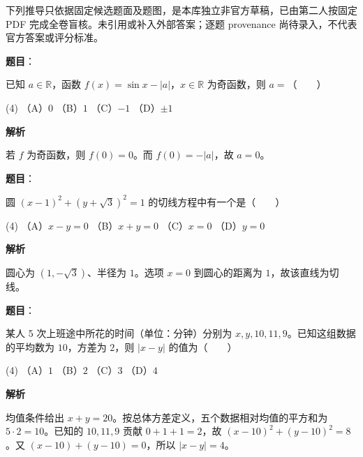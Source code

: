 

\begin{gktip}
下列推导只依据固定候选题面及题图，是本库独立非官方草稿，已由第二人按固定 PDF 完成全卷盲核。未引用或补入外部答案；逐题 provenance 尚待录入，不代表官方答案或评分标准。
\end{gktip}

\begin{answer}

\textbf{题目}：

已知 $a\in\mathbb R$，函数 $f(x)=\sin x-|a|$，$x\in\mathbb R$ 为奇函数，则 $a=$\mbox{（　　）}

\begin{gkopts}(4)
\task （A）$0$
\task （B）$1$
\task （C）$-1$
\task （D）$\pm1$
\end{gkopts}

\textbf{解析}

若 $f$ 为奇函数，则 $f(0)=0$。而 $f(0)=-|a|$，故 $a=0$。


\end{answer}
\begin{answer}

\textbf{题目}：

圆 $(x-1)^2+(y+\sqrt3)^2=1$ 的切线方程中有一个是\mbox{（　　）}

\begin{gkopts}(4)
\task （A）$x-y=0$
\task （B）$x+y=0$
\task （C）$x=0$
\task （D）$y=0$
\end{gkopts}

\textbf{解析}

圆心为 $(1,-\sqrt3)$、半径为 $1$。选项 $x=0$ 到圆心的距离为 $1$，故该直线为切线。


\end{answer}
\begin{answer}

\textbf{题目}：

某人 5 次上班途中所花的时间（单位：分钟）分别为 $x,y,10,11,9$。已知这组数据的平均数为 $10$，方差为 $2$，则 $|x-y|$ 的值为\mbox{（　　）}

\begin{gkopts}(4)
\task （A）$1$
\task （B）$2$
\task （C）$3$
\task （D）$4$
\end{gkopts}

\textbf{解析}

均值条件给出 $x+y=20$。按总体方差定义，五个数据相对均值的平方和为 $5\cdot2=10$。已知的 $10,11,9$ 贡献 $0+1+1=2$，故 $(x-10)^2+(y-10)^2=8$。又 $(x-10)+(y-10)=0$，所以 $|x-y|=4$。


\end{answer}
